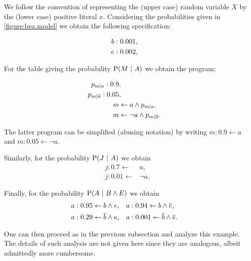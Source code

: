 \documentclass{tlp}
\newcommand{\at}[1]{\ensuremath{\!\del{#1}}}        %
\newcommand{\clause}{\ensuremath{\leftarrow}}
\newcommand{\co}[1]{\ensuremath{\overline{#1}}}     %
\newcommand{\prfunc}{\ensuremath{\mathrm{P}}}
\newcommand{\pr}[1]{\ensuremath{\prfunc\at{#1}}}
\newcommand{\given}{\ensuremath{~\middle|~}}
\newcommand{\probfact}[2]{\ensuremath{#1:#2}}
\newcommand{\probrule}[3]{\probfact{#1}{#2} \leftarrow #3}
\newcommand{\condsymb}[2]{\ensuremath{p_{#1|#2}}}
\begin{document}
We follow the convention of representing the (upper case) random
variable \(X\) by the (lower case) positive literal \(x\).
%
Considering the probabilities given in \cref{figure:bea.model} we obtain
the following specification:

\begin{equation*}
    \begin{aligned}
        \probfact{b}{0.001} & ,\cr \probfact{e}{0.002} & ,\cr \end{aligned}
    \label{eq:not_so_simple_example}
\end{equation*}

For the table giving the probability \(\pr{M \given A}\) we obtain the
program:

\begin{equation*}
    \begin{aligned}
        \probfact{\condsymb{m}{a}}{0.9} & ,\cr \probfact{\condsymb{m}{\co{a}}}{0.05} & ,\cr m & \clause a \wedge \condsymb{m}{a},\cr m & \clause \neg a \wedge \condsymb{m}{\co{a}}.
    \end{aligned}
\end{equation*}

The latter program can be simplified (abusing notation) by writing
\(\probrule{m}{0.9}{a}\) and \(\probrule{m}{0.05}{\neg a}\).

Similarly, for the probability \(\pr{J \given A}\) we obtain
\begin{equation*}
    \begin{aligned}
        \probrule{j}{0.7}{  & a},      \\
        \probrule{j}{0.01}{ & \neg a},
    \end{aligned}
\end{equation*}

Finally, for the probability \(\pr{A \given B \wedge E}\) we obtain
\begin{equation*}
    \begin{aligned}
        \probrule{a}{0.95}{b \wedge e},                                              &  &  &
        \probrule{a}{0.94}{b \wedge \co{e}},\cr \probrule{a}{0.29}{\co{b} \wedge e}, &  &  &
        \probrule{a}{0.001}{\co{b} \wedge \co{e}}.
    \end{aligned}\label{eq:prA.given.B.and.E}
\end{equation*}

One can then proceed as in the previous subsection and analyze this
example.  The details of such analysis are not given here since they
are analogous, albeit admittedly more cumbersome.
\end{document}
